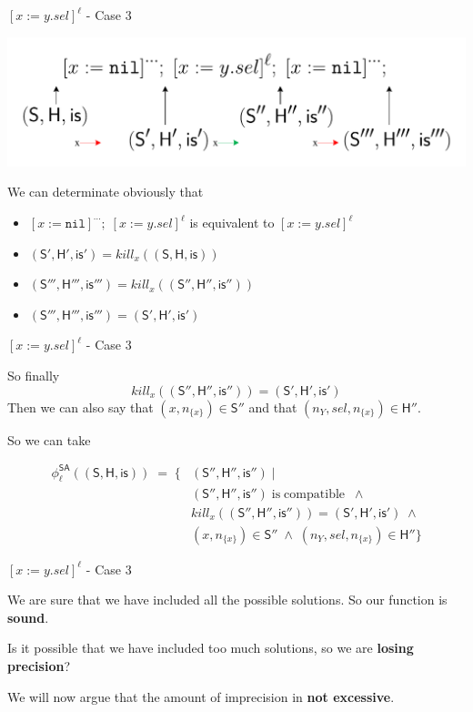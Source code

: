 \documentclass[xcolor=svgnames,11pt]{beamer}
\begin{document}
\begin{frame}[fragile]{$[x:=y.sel]^\ell$ - Case 3}

\includegraphics[scale=0.5]{../figures/fig11.pdf}

\pause
We can determinate obviously that
\begin{itemize}
\item $[x:=\mathtt{nil}]^{\cdots};\;[x:=y.sel]^{\ell}$ is equivalent to $[x:=y.sel]^{\ell}$
\pause
\item $\mathsf{(S',H',is')} = kill_x \mathsf{((S,H,is))}$ 
\pause
\item $\mathsf{(S''',H''',is''')} = kill_x \mathsf{((S'',H'',is''))}$ 
\pause
\item $\mathsf{(S''',H''',is''')} = \mathsf{(S',H',is')} $
\end{itemize}
\end{frame}

\begin{frame}{$[x:=y.sel]^\ell$ - Case 3}

So finally $$kill_x \mathsf{((S'',H'',is''))} = \mathsf{(S',H',is')}$$
Then we can also say that $(x, n_{ \{x\} }) \in \mathsf{S''}$ and that $(n_Y, sel, n_{ \{ x \} }) \in \mathsf{H''}$.

\medskip
\pause

So we can take
\begin{block}{}
\begin{align*}
\phi_{\ell}^{\mathsf{SA}}((\mathsf{S,H,is})) \;=\;  \{&(\mathsf{S'',H'',is''}) \;|\;\\
&(\mathsf{S'',H'',is''}) \mathrm{\;is\;compatible\;} \;\wedge \\
&kill_x ((\mathsf{S'',H'',is''})) = (\mathsf{S',H',is'}) \;\wedge \\
&(x, n_{ \{x\} }) \in \mathsf{S''} \;\wedge\; (n_Y, sel, n_{ \{ x \} }) \in \mathsf{H''} \}
\end{align*}
\end{block}
\end{frame}

\begin{frame}{$[x:=y.sel]^\ell$ - Case 3}

We are sure that we have included all the possible solutions. So our function is \textbf{sound}.

\medskip
\pause

Is it possible that we have included too much solutions, so we are \textbf{losing precision}?

\medskip
\pause

We will now argue that the amount of imprecision in \textbf{not excessive}.

\end{frame}
\end{document}
